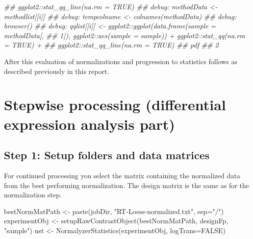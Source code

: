 \documentclass[]{article}
\newcommand{\hlnum}[1]{\textcolor[rgb]{0.816,0.125,0.439}{#1}}%
\newcommand{\hlstr}[1]{\textcolor[rgb]{0.251,0.627,0.251}{#1}}%
\newcommand{\hlcom}[1]{\textcolor[rgb]{0.502,0.502,0.502}{\textit{#1}}}%
\newcommand{\hlstd}[1]{\textcolor[rgb]{0.251,0.251,0.251}{#1}}%
\newenvironment{Shaded}{\begin{myshaded}}{\end{myshaded}}
\newcommand{\ConstantTok}[1]{\hlnum{#1}}
\newcommand{\StringTok}[1]{\hlstr{#1}}
\newcommand{\DocumentationTok}[1]{\hlcom{#1}}
\newcommand{\OtherTok}[1]{{#1}}
\newcommand{\FunctionTok}[1]{\hlstd{#1}}
\newcommand{\AttributeTok}[1]{{#1}}
\newcommand{\NormalTok}[1]{\hlstd{#1}}
\begin{document}
\begin{Shaded}
\begin{Highlighting}[]
\DocumentationTok{\#\#     ggplot2::stat\_qq\_line(na.rm = TRUE)}
\DocumentationTok{\#\# debug: methodData \textless{}{-} methodlist[[i]]}
\DocumentationTok{\#\# debug: tempcolname \textless{}{-} colnames(methodData)}
\DocumentationTok{\#\# debug: browser()}
\DocumentationTok{\#\# debug: qqlist[[i]] \textless{}{-} ggplot2::ggplot(data.frame(sample = methodData[, }
\DocumentationTok{\#\#     1]), ggplot2::aes(sample = sample)) + ggplot2::stat\_qq(na.rm = TRUE) + }
\DocumentationTok{\#\#     ggplot2::stat\_qq\_line(na.rm = TRUE)}
\DocumentationTok{\#\# pdf }
\DocumentationTok{\#\#   2}
\end{Highlighting}
\end{Shaded}

After this evaluation of normalizations and progression to statistics follows as described previously in this report.

\hypertarget{stepwise-processing-differential-expression-analysis-part}{%
\section{Stepwise processing (differential expression analysis part)}\label{stepwise-processing-differential-expression-analysis-part}}

\hypertarget{step-1-setup-folders-and-data-matrices}{%
\subsection{Step 1: Setup folders and data matrices}\label{step-1-setup-folders-and-data-matrices}}

For continued processing you select the matrix containing the normalized data
from the best performing normalization. The design matrix is the same as for
the normalization step.

\begin{Shaded}
\begin{Highlighting}[]
\NormalTok{bestNormMatPath }\OtherTok{\textless{}{-}} \FunctionTok{paste}\NormalTok{(jobDir, }\StringTok{"RT{-}Loess{-}normalized.txt"}\NormalTok{, }\AttributeTok{sep=}\StringTok{"/"}\NormalTok{)}
\NormalTok{experimentObj }\OtherTok{\textless{}{-}} \FunctionTok{setupRawContrastObject}\NormalTok{(bestNormMatPath, designFp, }\StringTok{"sample"}\NormalTok{)}
\NormalTok{nst }\OtherTok{\textless{}{-}} \FunctionTok{NormalyzerStatistics}\NormalTok{(experimentObj, }\AttributeTok{logTrans=}\ConstantTok{FALSE}\NormalTok{)}
\end{Highlighting}
\end{Shaded}
\end{document}
